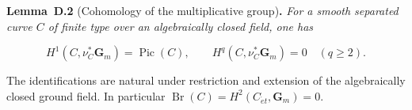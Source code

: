 \documentclass[11pt]{article}
\newenvironment{bpstatement}[2]{\par\addvspace{0.6\baselineskip}\noindent\textbf{#1}#2\textbf{.}\enspace\ignorespaces}
  {\par\addvspace{0.4\baselineskip}}
\newenvironment{bpstatementit}[2]{\begin{bpstatement}{#1}{#2}\itshape\ignorespaces}{\end{bpstatement}}
\begin{document}
\label{bp7}%
\begin{bpstatementit}{Lemma~D.2}{ (Cohomology of the multiplicative group)}
For a smooth separated curve \(C\) of finite type over an algebraically closed field, one has

\[
H^1(C,\nu_C^*\mathbf G_m)=\operatorname{Pic}(C),
\qquad
H^q(C,\nu_C^*\mathbf G_m)=0\quad(q\geq2).
\]

The identifications are natural under restriction and extension of the algebraically closed ground field. In particular \(\operatorname{Br}(C)=H^2(C_{\acute{e}t},\mathbf G_m)=0\).
\end{bpstatementit}
\end{document}
